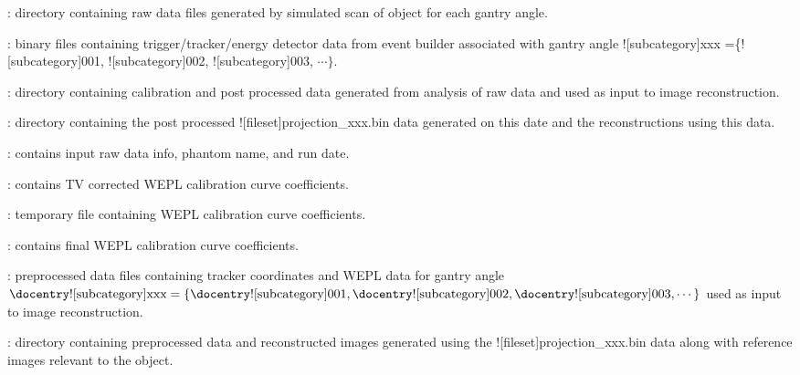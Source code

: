 \begin{tcbenvironment}
\begin{tcbparagraph}
\begin{ThinEnum}
\begin{ThinEnum}
\begin{ThinEnum}
\begin{ThinEnum}
                    \begin{ThinEnum}
                        \item {} : directory containing raw data files generated by simulated scan of object for each gantry angle.
                        \begin{ThinEnum}
                            \item {} : binary files containing trigger/tracker/energy detector data from event builder associated with gantry angle \docentry![subcategory]{xxx} =\{\docentry![subcategory]{001}, \docentry![subcategory]{002}, \docentry![subcategory]{003}, $\cdots\}$.
                        \end{ThinEnum}
                        \item {} : directory containing calibration and post processed data generated from analysis of raw data and used as input to image reconstruction.
                        \begin{ThinEnum}
                            \item {} : directory containing the post processed \docentry![fileset]{projection\_xxx.bin} data generated on this date and the reconstructions using this data.
                            \begin{ThinEnum}
                                \item {} : contains input raw data info, phantom name, and run date.
                    			\item {} : contains TV corrected WEPL calibration curve coefficients.
						\item {} : temporary file containing WEPL calibration curve coefficients.
                                	\item {} : contains final WEPL calibration curve coefficients.
                                \item {} : preprocessed data files containing tracker coordinates and WEPL data for gantry angle $\text{\docentry![subcategory]{xxx}} =\{\text{\docentry![subcategory]{001}}, \text{\docentry![subcategory]{002}}, \text{\docentry![subcategory]{003}}, \cdots\}$ used as input to image reconstruction.                         	
                                \item {} : directory containing preprocessed data and reconstructed images generated using the \docentry![fileset]{projection\_xxx.bin} data along with reference images relevant to the object.

\end{ThinEnum}
\end{ThinEnum}
\end{ThinEnum}
\end{ThinEnum}
\end{ThinEnum}
\end{ThinEnum}
\end{ThinEnum}
\end{tcbparagraph}
\end{tcbenvironment}
